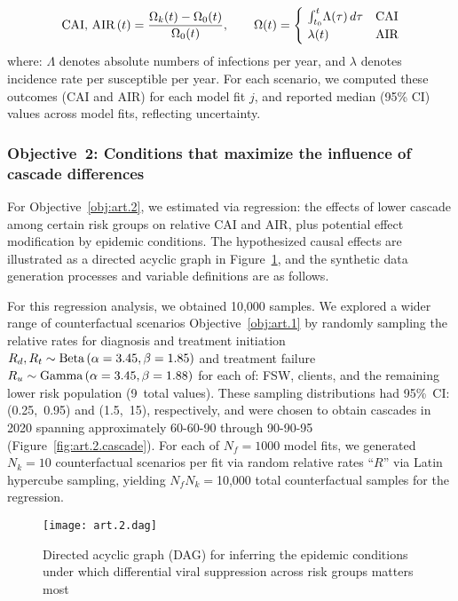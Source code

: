 \begin{equation}
  \textnormal{CAI, AIR}\,(t) = \frac{\Omega_{k}(t) - \Omega_{0}(t)}{\Omega_{0}(t)}
  ,\qquad \Omega(t) =
  \begin{cases}
    ~\int_{t_0}^{t}\!\Lambda(\tau)\,d\tau & \textnormal{CAI} \\
    ~\lambda(t) & \textnormal{AIR}
  \end{cases}
\end{equation} where:
$\Lambda$ denotes absolute numbers of infections per year, and
$\lambda$ denotes incidence rate per susceptible per year.
For each scenario, we computed these outcomes (CAI and AIR) for each model fit $j$,
and reported median (95\% CI) values across model fits, reflecting uncertainty.
\subsubsection{Objective~2: Conditions that maximize the influence of cascade differences}\label{art.meth.obj.2}
For Objective~\ref{obj:art.2}, we estimated via regression:
the effects of lower cascade among certain risk groups on relative CAI and AIR,
plus potential effect modification by epidemic conditions.
The hypothesized causal effects are illustrated
as a directed acyclic graph in Figure~\ref{fig:art.2.dag},
and the synthetic data generation processes and variable definitions are as follows.
\par
For this regression analysis, we obtained 10,000 samples.
We explored a wider range of counterfactual scenarios \vs Objective~\ref{obj:art.1}
by randomly sampling the relative rates for
diagnosis and treatment initiation $R_d, R_t \sim \textnormal{Beta}\,(\alpha=3.45,\beta=1.85)$
and treatment failure $R_u \sim \textnormal{Gamma}\,(\alpha=3.45,\beta=1.88)$
for each of: FSW, clients, and the remaining lower risk population (9~total values).
These sampling distributions had 95\%~CI: (0.25,~0.95) and (1.5,~15), respectively,
and were chosen to obtain cascades in 2020 spanning
approximately \mbox{60-60-90} through \mbox{90-90-95} (Figure~\ref{fig:art.2.cascade}). %
For each of $N_f = 1000$ model fits, we generated $N_k = 10$ counterfactual scenarios per fit
via random relative rates ``$R$'' via Latin hypercube sampling,
yielding $N_f N_k = {}$10,000 total counterfactual samples for the regression.
\begin{figure}
  \centering\texttt{[image: art.2.dag]}
  \caption{Directed acyclic graph (DAG) for inferring
    the epidemic conditions under which
    differential viral suppression across risk groups matters most}
  \label{fig:art.2.dag}
\end{figure}
